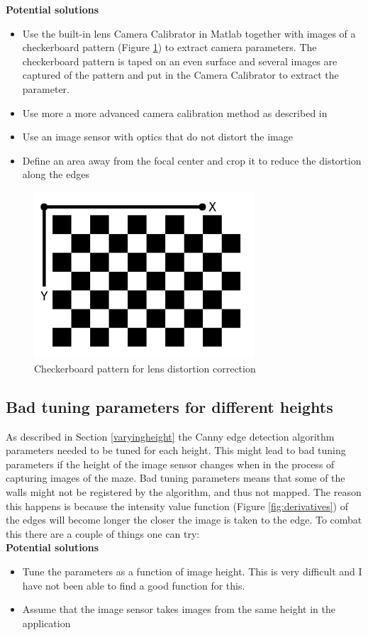 \textbf{Potential solutions}
\begin{itemize}
\item Use the built-in lens Camera Calibrator in Matlab together with images of a checkerboard pattern (Figure \ref{fig:checker}) to extract camera parameters. The checkerboard pattern is taped on an even surface and several images are captured of the pattern and put in the Camera Calibrator to extract the parameter.
\item Use more a more advanced camera calibration method as described in \cite{lens}
\item Use an image sensor with optics that do not distort the image 
\item Define an area away from the focal center and crop it to reduce the distortion along the edges
\end{itemize}
\begin{figure}[H]
\centering
\includegraphics[width=0.73\textwidth]{fig/checker}
  \caption{Checkerboard pattern for lens distortion correction}
  \label{fig:checker}
\end{figure}

\subsection{Bad tuning parameters for different heights}
As described in Section \ref{varyingheight} the Canny edge detection algorithm parameters needed to be tuned for each height. This might lead to bad tuning parameters if the height of the image sensor changes when in the process of capturing images of the maze. Bad tuning parameters means that some of the walls might not be registered by the algorithm, and thus not mapped. The reason this happens is because the intensity value function (Figure \ref{fig:derivatives}) of the edges will become longer the closer the image is taken to the edge. To combat this there are a couple of things one can try:\\

\textbf{Potential solutions}
\begin{itemize}
\item Tune the parameters as a function of image height. This is very difficult and I have not been able to find a good function for this.
\item Assume that the image sensor takes images from the same height in the application
\end{itemize}











